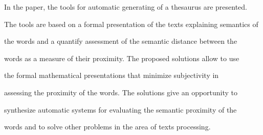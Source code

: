 In the paper, the tools for automatic generating of a thesaurus are presented. 


The tools are based on a formal presentation of the texts explaining semantics of 


the words and a quantify assessment of the semantic distance between the 


words as a measure of their proximity. The proposed solutions allow to use 


the formal mathematical presentations that minimize subjectivity in 


assessing the proximity of the words. The solutions give an opportunity to 


synthesize automatic systems for evaluating the semantic proximity of the 


words and to solve other problems in the area of texts processing.































\def\tit{APPROXIMATION OF A~MULTIDIMENSIONAL DEPENDENCY BASED ON LINEAR EXPANSION\\ IN A 


DICTIONARY OF PARAMETRIC FUNCTIONS}





\def\aut{M.\,G.~Belyaev$^1$ and E.\,V.~Bunaev$^2$}





\def\auf{$^1$Institute for Information Transmission Problems RAS, Moscow 


Institute of Physics and Technology, Datadvance LLC, belyaev@iitp.ru\\[1pt]


$^2$Institute for Information Transmission Problems RAS, Moscow 


Institute of Physics and Technology, Datadvance LLC, burnaev@iitp.ru}









